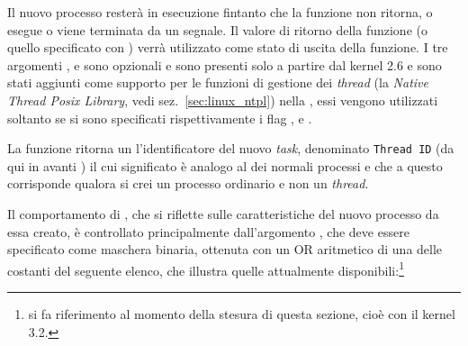 Il nuovo processo resterà in esecuzione fintanto che la funzione 
non ritorna, o esegue  o viene terminata da un segnale. Il valore
di ritorno della funzione (o quello specificato con ) verrà
utilizzato come stato di uscita della funzione. I tre
argomenti ,  e  sono opzionali e sono
presenti solo a partire dal kernel 2.6 e sono stati aggiunti come supporto per
le funzioni di gestione dei \textit{thread} (la \textit{Native Thread Posix
  Library}, vedi sez.~\ref{sec:linux_ntpl}) nella , essi vengono
utilizzati soltanto se si sono specificati rispettivamente i flag
,  e
. 

La funzione ritorna un l'identificatore del nuovo \textit{task}, denominato
\texttt{Thread ID} (da qui in avanti ) il cui significato è analogo
al  dei normali processi e che a questo corrisponde qualora si crei
un processo ordinario e non un \textit{thread}.

Il comportamento di , che si riflette sulle caratteristiche del
nuovo processo da essa creato, è controllato principalmente
dall'argomento , che deve essere specificato come maschera
binaria, ottenuta con un OR aritmetico di una delle costanti del seguente
elenco, che illustra quelle attualmente disponibili:\footnote{si fa
  riferimento al momento della stesura di questa sezione, cioè con il kernel
  3.2.}

